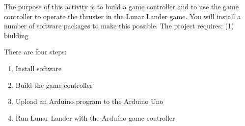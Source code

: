 
\apparatus
{}

\longgoal

The purpose of this activity is to build a game controller and to use the game controller to operate the thruster in the Lunar Lander game. You will install a number of software packages to make this possible. The project requires: (1) biulding 

\procedure

There are four steps:

\begin{enumerate}
	\item Install software
	\item Build the game controller
	\item Upload an Arduino program to the Arduino Uno
	\item Run Lunar Lander with the Arduino game controller
\end{enumerate}

